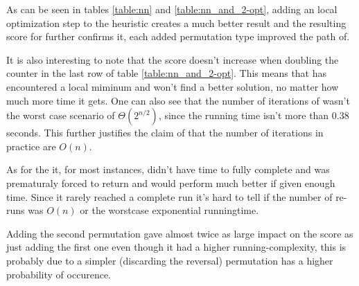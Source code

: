 As can be seen in tables \ref{table:nn} and \ref{table:nn_and_2-opt}, adding an
local optimization step to the heuristic creates a much better result and the resulting score for 
 further confirms it, each added permutation type improved the path of.

It is also interesting to note that the score doesn't increase when doubling
the counter in the last row of table \ref{table:nn_and_2-opt}. This means that
 has encountered a local miminum and won't find a better solution,
no matter how much more time it gets. One can also see that the number of
iterations of  wasn't the worst case scenario of
$\Theta(2^{n/2})$, since the running time isn't more than 0.38 seconds. This
further justifies the claim of \cite{hastad} that the number of iterations in
practice are $O(n)$.

As for the  it, for most instances, didn't have time to fully complete 
and was prematuraly forced to return and would perform much better if given enough time. 
Since it rarely reached a complete run it's hard to tell if the number of re-runs was $O(n)$ or the worstcase exponential runningtime.

Adding the second permutation gave almost twice as large impact on the score as just adding the first one even though it had a higher running-complexity,
this is probably due to a simpler (discarding the reversal) permutation has a higher probability of occurence.
